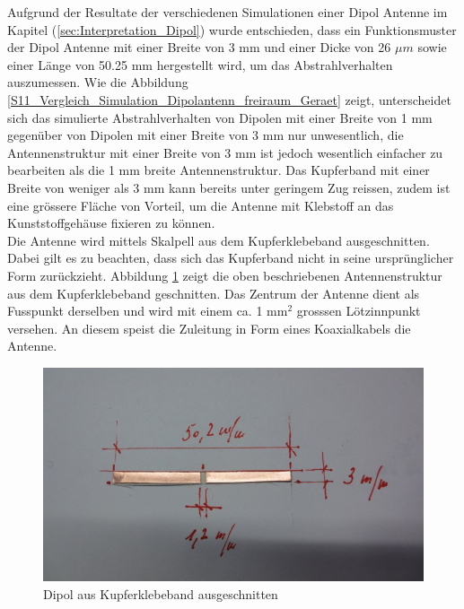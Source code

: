 Aufgrund der Resultate der verschiedenen Simulationen einer Dipol Antenne im Kapitel (\ref{sec:Interpretation_Dipol}) wurde entschieden, dass ein Funktionsmuster der Dipol Antenne mit einer Breite von 3 mm und einer Dicke von 26 $\mu m$ sowie einer Länge von 50.25 mm hergestellt wird, um das Abstrahlverhalten auszumessen. Wie die Abbildung \ref{S11_Vergleich_Simulation_Dipolantenn_freiraum_Geraet} zeigt, unterscheidet sich das simulierte Abstrahlverhalten von Dipolen mit einer Breite von 1 mm gegenüber von Dipolen mit einer Breite von 3 mm nur unwesentlich, die Antennenstruktur mit einer Breite von 3 mm ist jedoch wesentlich einfacher zu bearbeiten als die 1 mm breite Antennenstruktur. Das Kupferband mit einer Breite von weniger als 3 mm kann bereits unter geringem Zug reissen, zudem ist eine grössere Fläche von Vorteil, um die Antenne mit Klebstoff an das Kunststoffgehäuse fixieren zu können.  \\
\newpage
Die Antenne wird mittels Skalpell aus dem Kupferklebeband ausgeschnitten. Dabei gilt es zu beachten, dass sich das Kupferband nicht in seine ursprünglicher Form zurückzieht. Abbildung \ref{fig:DipolausKupferband} zeigt die oben beschriebenen Antennenstruktur aus dem Kupferklebeband geschnitten.  Das Zentrum der Antenne dient als Fusspunkt derselben und wird mit einem ca. 1 mm$^{2}$ grosssen Lötzinnpunkt versehen. An diesem speist die Zuleitung in Form eines Koaxialkabels die Antenne.\\
\begin{figure}[!ht]
	\centering
	\includegraphics[width=15cm]{content/bilder/Implementierung/Dipol3mm50mm.jpg}%
	\caption{Dipol aus Kupferklebeband ausgeschnitten}
	\label{fig:DipolausKupferband}
\end{figure}

